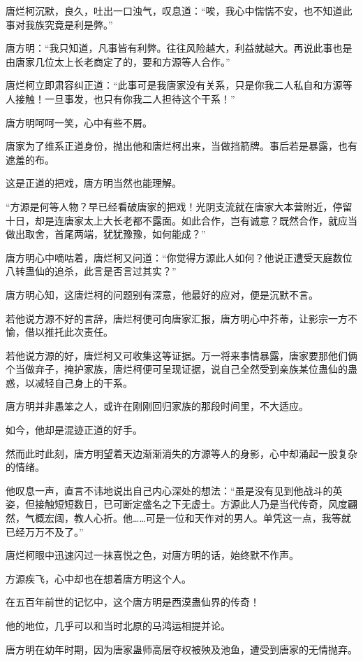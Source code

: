 \begin{this_body}
唐烂柯沉默，良久，吐出一口浊气，叹息道：“唉，我心中惴惴不安，也不知道此事对我族究竟是利是弊。”

唐方明：“我只知道，凡事皆有利弊。往往风险越大，利益就越大。再说此事也是由唐家几位太上长老商定了的，要和方源等人合作。”

唐烂柯立即肃容纠正道：“此事可是我唐家没有关系，只是你我二人私自和方源等人接触！一旦事发，也只有你我二人担待这个干系！”

唐方明呵呵一笑，心中有些不屑。

唐家为了维系正道身份，抛出他和唐烂柯出来，当做挡箭牌。事后若是暴露，也有遮羞的布。

这是正道的把戏，唐方明当然也能理解。

“方源是何等人物？早已经看破唐家的把戏！光阴支流就在唐家大本营附近，停留十日，却是连唐家太上大长老都不露面。如此合作，岂有诚意？既然合作，就应当做出取舍，首尾两端，犹犹豫豫，如何能成？”

唐方明心中嘀咕着，唐烂柯又问道：“你觉得方源此人如何？他说正遭受天庭数位八转蛊仙的追杀，此言是否言过其实？”

唐方明心知，这唐烂柯的问题别有深意，他最好的应对，便是沉默不言。

若他说方源不好的言辞，唐烂柯便可向唐家汇报，唐方明心中芥蒂，让影宗一方不愉，借以推托此次责任。

若他说方源的好，唐烂柯又可收集这等证据。万一将来事情暴露，唐家要那他们俩个当做弃子，掩护家族，唐烂柯便可呈现证据，说自己全然受到亲族某位蛊仙的蛊惑，以减轻自己身上的干系。

唐方明并非愚笨之人，或许在刚刚回归家族的那段时间里，不大适应。

如今，他却是混迹正道的好手。

然而此时此刻，唐方明望着天边渐渐消失的方源等人的身影，心中却涌起一股复杂的情绪。

他叹息一声，直言不讳地说出自己内心深处的想法：“虽是没有见到他战斗的英姿，但接触短短数日，已可断定盛名之下无虚士。方源此人乃是当代传奇，风度翩然，气概宏阔，教人心折。他……可是一位和天作对的男人。单凭这一点，我等就已经万万不及了。”

唐烂柯眼中迅速闪过一抹喜悦之色，对唐方明的话，始终默不作声。

方源疾飞，心中却也在想着唐方明这个人。

在五百年前世的记忆中，这个唐方明是西漠蛊仙界的传奇！

他的地位，几乎可以和当时北原的马鸿运相提并论。

唐方明在幼年时期，因为唐家蛊师高层夺权被殃及池鱼，遭受到唐家的无情抛弃。


\end{this_body}
